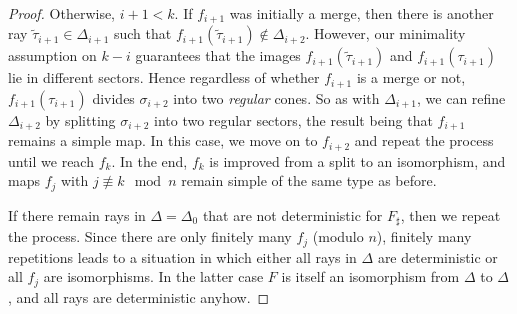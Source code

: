 \documentclass[11pt]{amsart}
\theoremstyle{definition}
\theoremstyle{plain}
\theoremstyle{remark}
\numberwithin{equation}{section}
\begin{document}
\begin{proof}
Otherwise, $i+1<k$.  If $f_{i+1}$ was initially a merge, then there is another ray $\tilde\tau_{i+1}\in\Delta_{i+1}$ such that $f_{i+1}(\tilde\tau_{i+1})\notin\Delta_{i+2}$.  However, our minimality assumption on $k-i$ guarantees that the images $f_{i+1}(\tilde\tau_{i+1})$ and $f_{i+1}(\tau_{i+1})$ lie in different sectors.  Hence regardless of whether $f_{i+1}$ is a merge or not, $f_{i+1}(\tau_{i+1})$ divides $\sigma_{i+2}$ into two \emph{regular} cones.  So as with $\Delta_{i+1}$, we can refine $\Delta_{i+2}$ by splitting $\sigma_{i+2}$ into two regular sectors, the result being that $f_{i+1}$ remains a simple map.  In this case, we move on to $f_{i+2}$ and repeat the process until we reach $f_k$.  In the end, $f_k$ is improved from a split to an isomorphism, and maps $f_j$ with $j\not\equiv k\mod n$ remain simple of the same type as before.



If there remain rays in $\Delta=\Delta_0$ that are not deterministic for $F_\sharp$, then we repeat the process.  Since there are only finitely many $f_j$ (modulo $n$), finitely many repetitions leads to a situation in which either all rays in $\Delta$ are deterministic or all $f_j$ are isomorphisms.  In the latter case $F$ is itself an isomorphism from $\Delta$ to $\Delta$, and all rays are deterministic anyhow.
\end{proof}
\end{document}
